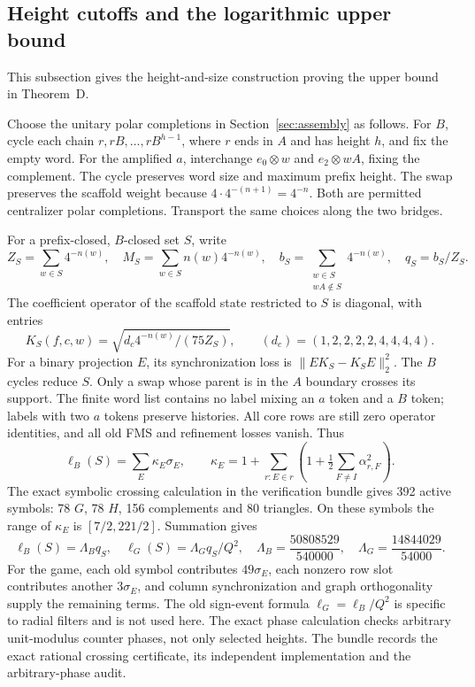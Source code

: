\subsection{Height cutoffs and the logarithmic upper bound}\label{sec:v11-height}
This subsection gives the height-and-size construction proving the upper bound in Theorem~D.

Choose the unitary polar completions in Section~\ref{sec:assembly} as follows. For $B$, cycle each chain $r,rB,\ldots,rB^{h-1}$, where $r$ ends in $A$ and has height $h$, and fix the empty word. For the amplified $a$, interchange $e_0\otimes w$ and $e_2\otimes wA$, fixing the complement. The cycle preserves word size and maximum prefix height. The swap preserves the scaffold weight because $4\cdot4^{-(n+1)}=4^{-n}$. Both are permitted centralizer polar completions. Transport the same choices along the two bridges.

For a prefix-closed, $B$-closed set $S$, write
\[
 Z_S=\sum_{w\in S}4^{-n(w)},\quad M_S=\sum_{w\in S}n(w)4^{-n(w)},\quad
 b_S=\sum_{\substack{w\in S\\wA\notin S}}4^{-n(w)},\quad q_S=b_S/Z_S.
\]
The coefficient operator of the scaffold state restricted to $S$ is diagonal, with entries
\[
 K_S(f,c,w)=\sqrt{d_c4^{-n(w)}/(75Z_S)},\qquad
 (d_c)=(1,2,2,2,2,4,4,4,4).
\]
For a binary projection $E$, its synchronization loss is $\|EK_S-K_SE\|_2^2$.
The $B$ cycles reduce $S$. Only a swap whose parent is in the $A$ boundary crosses its support. The finite word list contains no label mixing an $a$ token and a $B$ token; labels with two $a$ tokens preserve histories. All core rows are still zero operator identities, and all old FMS and refinement losses vanish. Thus
\[
 \ell_B(S)=\sum_E\kappa_E\sigma_E,\qquad
 \kappa_E=1+\sum_{r:E\in r}\left(1+\tfrac12\sum_{F\ne I}\alpha_{r,F}^2\right).
\]
The exact symbolic crossing calculation in the verification bundle gives 392 active symbols: 78 $G$, 78 $H$, 156 complements and 80 triangles. On these symbols the range of $\kappa_E$ is $[7/2,221/2]$. Summation gives
\begin{equation}\label{eq:v11-boundary}
 \ell_B(S)=\Lambda_Bq_S,\quad
 \ell_G(S)=\Lambda_Gq_S/Q^2,\quad
 \Lambda_B=\frac{50808529}{540000},\quad
 \Lambda_G=\frac{14844029}{54000}.
\end{equation}
For the game, each old symbol contributes $49\sigma_E$, each nonzero row slot contributes another $3\sigma_E$, and column synchronization and graph orthogonality supply the remaining terms. The old sign-event formula $\ell_G=\ell_B/Q^2$ is specific to radial filters and is not used here. The exact phase calculation checks arbitrary unit-modulus counter phases, not only selected heights. The bundle records the exact rational crossing certificate, its independent implementation and the arbitrary-phase audit.

